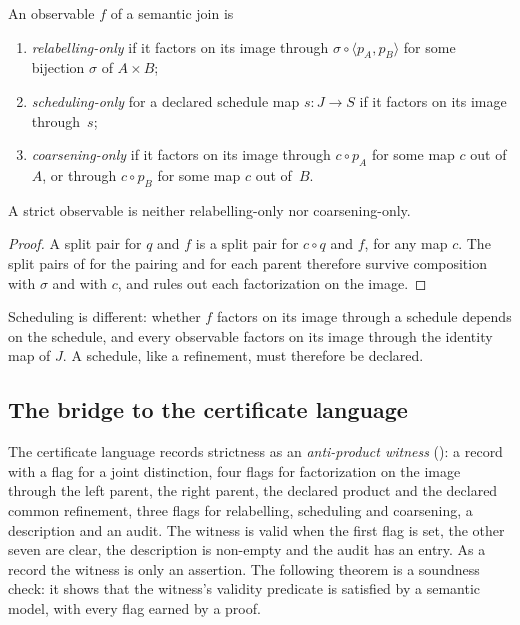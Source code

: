 \begin{definition}
\label{def:cheap}
An observable $f$ of a semantic join is
\begin{enumerate}[nosep]
  \item \emph{relabelling-only} if it factors on its image through
        $\sigma\circ\langle p_A,p_B\rangle$ for some bijection $\sigma$ of $A\times B$;
  \item \emph{scheduling-only} for a declared schedule map $s:J\to S$ if it factors on its
        image through~$s$;
  \item \emph{coarsening-only} if it factors on its image through $c\circ p_A$ for some map
        $c$ out of $A$, or through $c\circ p_B$ for some map $c$ out of~$B$.
\end{enumerate}
\end{definition}

\begin{proposition}
\label{prop:strict-not-cheap}
A strict observable is neither relabelling-only nor coarsening-only.
\end{proposition}

\begin{proof}
A split pair for $q$ and $f$ is a split pair for $c\circ q$ and $f$, for any map $c$. The
split pairs of  for the pairing and for each parent therefore
survive composition with $\sigma$ and with $c$, and  rules out
each factorization on the image.
\end{proof}

Scheduling is different: whether $f$ factors on its image through a schedule depends on
the schedule, and every observable factors on its image through the identity map of $J$. A schedule,
like a refinement, must therefore be declared.

\subsection{The bridge to the certificate language}
\label{sec:bridge}

The certificate language records strictness as an \emph{anti-product witness}
(): a record with a flag for a joint distinction, four flags
for factorization on the image through the left parent, the right parent, the declared product and the
declared common refinement, three flags for relabelling, scheduling and coarsening, a
description and an audit. The witness is valid when the first flag is set, the other seven
are clear, the description is non-empty and the audit has an entry. As a record the
witness is only an assertion. The following theorem is a soundness check: it shows that
the witness's validity predicate is satisfied by a semantic model, with every flag earned
by a proof.

